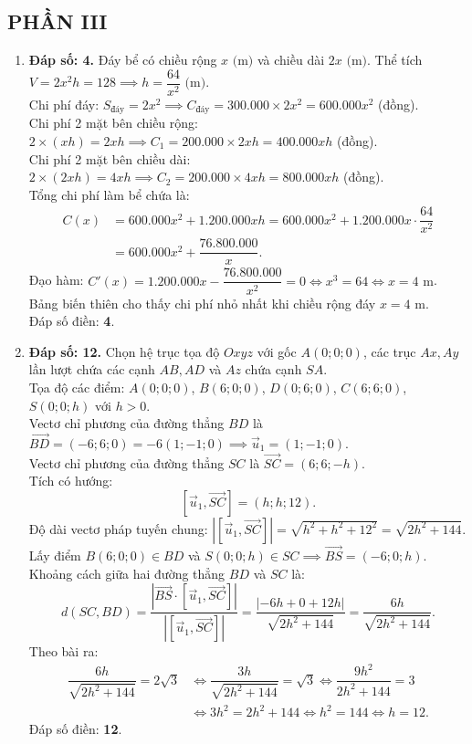 \documentclass[12pt,a4paper]{article}
\begin{document}
\subsection*{PHẦN III}
\begin{enumerate}[label=\textbf{Câu \arabic*:}, leftmargin=*]
\item \textbf{Đáp số: 4.}
Đáy bể có chiều rộng $x\text{ (m)}$ và chiều dài $2x\text{ (m)}$. Thể tích $V = 2x^2 h = 128 \implies h = \dfrac{64}{x^2}\text{ (m)}$.\\
Chi phí đáy: $S_{\text{đáy}} = 2x^2 \implies C_{\text{đáy}} = 300.000 \times 2x^2 = 600.000 x^2$ (đồng).\\
Chi phí 2 mặt bên chiều rộng: $2 \times (xh) = 2xh \implies C_1 = 200.000 \times 2xh = 400.000 xh$ (đồng).\\
Chi phí 2 mặt bên chiều dài: $2 \times (2xh) = 4xh \implies C_2 = 200.000 \times 4xh = 800.000 xh$ (đồng).\\
Tổng chi phí làm bể chứa là:
$$\begin{aligned}
C(x) &= 600.000 x^2 + 1.200.000 xh = 600.000 x^2 + 1.200.000 x \cdot \dfrac{64}{x^2}\\
&= 600.000 x^2 + \dfrac{76.800.000}{x}.
\end{aligned}$$
Đạo hàm: $C'(x) = 1.200.000 x - \dfrac{76.800.000}{x^2} = 0 \iff x^3 = 64 \iff x = 4\text{ m}$.\\
Bảng biến thiên cho thấy chi phí nhỏ nhất khi chiều rộng đáy $x = 4\text{ m}$.\\
Đáp số điền: \textbf{4}.

\item \textbf{Đáp số: 12.}
Chọn hệ trục tọa độ $Oxyz$ với gốc $A(0; 0; 0)$, các trục $Ax, Ay$ lần lượt chứa các cạnh $AB, AD$ và $Az$ chứa cạnh $SA$.\\
Tọa độ các điểm: $A(0; 0; 0)$, $B(6; 0; 0)$, $D(0; 6; 0)$, $C(6; 6; 0)$, $S(0; 0; h)$ với $h > 0$.\\
Vectơ chỉ phương của đường thẳng $BD$ là $\overrightarrow{BD} = (-6; 6; 0) = -6(1; -1; 0) \implies \vec{u}_1 = (1; -1; 0)$.\\
Vectơ chỉ phương của đường thẳng $SC$ là $\overrightarrow{SC} = (6; 6; -h)$.\\
Tích có hướng:
$$\left[ \vec{u}_1, \overrightarrow{SC} \right] = (h; h; 12).$$
Độ dài vectơ pháp tuyến chung: $\left| \left[ \vec{u}_1, \overrightarrow{SC} \right] \right| = \sqrt{h^2 + h^2 + 12^2} = \sqrt{2h^2 + 144}$.\\
Lấy điểm $B(6; 0; 0) \in BD$ và $S(0; 0; h) \in SC \implies \overrightarrow{BS} = (-6; 0; h)$.\\
Khoảng cách giữa hai đường thẳng $BD$ và $SC$ là:
$$d(SC, BD) = \dfrac{\left| \overrightarrow{BS} \cdot \left[ \vec{u}_1, \overrightarrow{SC} \right] \right|}{\left| \left[ \vec{u}_1, \overrightarrow{SC} \right] \right|} = \dfrac{|-6h + 0 + 12h|}{\sqrt{2h^2 + 144}} = \dfrac{6h}{\sqrt{2h^2 + 144}}.$$
Theo bài ra:
$$\begin{aligned}
\dfrac{6h}{\sqrt{2h^2 + 144}} = 2\sqrt{3} &\iff \dfrac{3h}{\sqrt{2h^2 + 144}} = \sqrt{3} \iff \dfrac{9h^2}{2h^2 + 144} = 3\\
&\iff 3h^2 = 2h^2 + 144 \iff h^2 = 144 \iff h = 12.
\end{aligned}$$
Đáp số điền: \textbf{12}.


\end{enumerate}
\end{document}
